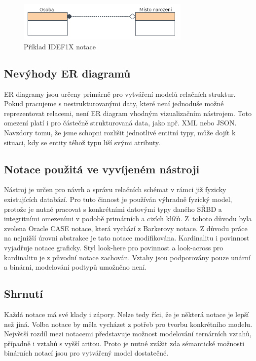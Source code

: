 \documentclass[czech,bachelor,public,dept460,male,oneside]{diploma}
\begin{document}
		\begin{figure}[!h]
			\centering
			\includegraphics[width=0.75\textwidth]{Figures/NotationExIDEF1X}
			\caption[Příklad IDEF1X notace]{Příklad IDEF1X notace \cite{whatIsERD}}
			\label{fig:notationExIDEF1X}
		\end{figure}
	
	\subsection{Nevýhody ER diagramů}
	ER diagramy jsou určeny primárně pro vytváření modelů relačních struktur. Pokud pracujeme s nestrukturovanými daty, které není jednoduše možné reprezentovat relacemi, není ER diagram vhodným vizualizačním nástrojem. Toto omezení platí i pro částečně strukturovaná data, jako npř. XML nebo JSON. Navzdory tomu, že jsme schopni rozlišit jednotlivé entitní typy, může dojít k situaci, kdy se entity téhož typu liší svými atributy. 
	
	\subsection{Notace použitá ve vyvíjeném nástroji}
	Nástroj je určen pro návrh a správu relačních schémat v rámci již fyzicky existujících databází. Pro tuto činnost je používán výhradně fyzický model, protože je nutné pracovat s konkrétními datovými typy daného SŘBD a integritními omezeními v podobě primárních a cizích klíčů. Z~tohoto důvodu byla zvolena Oracle CASE notace, která vychází z Barkerovy notace. Z důvodu práce na nejnižší úrovni abstrakce je tato notace modifikována. Kardinalitu i povinnost vyjadřuje notace graficky. Styl look-here pro povinnost a look-across pro kardinalitu je z původní notace zachován. Vztahy jsou podporovány pouze unární a binární, modelování podtypů umožněno není.
	
	\subsection{Shrnutí}
	Každá notace má své klady i zápory. Nelze tedy říci, že je některá notace je lepší než jiná. Volba notace by měla vycházet z potřeb pro tvorbu konkrétního modelu. Největší rozdíl mezi notacemi představuje možnost modelování ternárních vztahů, případně i vztahů s vyšší aritou. Proto je nutné zvážit zda sémantické možnosti binárních notací jsou pro vytvářený model dostatečné. 
	
\end{document}
